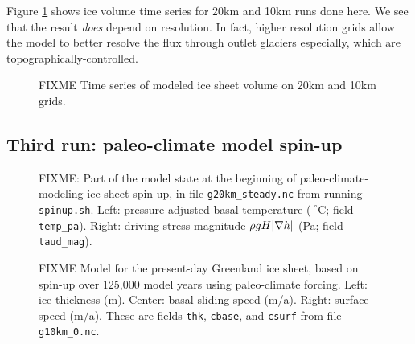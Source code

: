 Figure \ref{fig:ivolboth} shows ice volume time series for 20km and 10km runs done here.  We see that the result \emph{does} depend on resolution.  In fact, higher resolution grids allow the model to better resolve the flux through outlet glaciers especially, which are topographically-controlled.

\begin{figure}[ht]
\centering
\caption{FIXME Time series of modeled ice sheet volume on 20km and 10km grids.}
\label{fig:ivolboth}
\end{figure}


\subsection{Third run: paleo-climate model spin-up}  \label{subsect:paleorun}  


\begin{figure}[ht]
\centering
\caption{FIXME: Part of the model state at the beginning of paleo-climate-modeling ice sheet spin-up, in file \texttt{g20km_steady.nc} from running \texttt{spinup.sh}.  Left: pressure-adjusted basal temperature ($\phantom{|}^\circ$C; field \texttt{temp_pa}).  Right: driving stress magnitude $\rho g H |\nabla h|$ (Pa; field \texttt{taud_mag}).}
\label{fig:sr-spinstart}
\end{figure}


\begin{figure}[ht]
\centering
\caption{FIXME Model for the present-day Greenland ice sheet, based on spin-up over 125,000 model years using paleo-climate forcing.  Left: ice thickness (m).  Center: basal sliding speed (m/a).  Right: surface speed (m/a).  These are fields \texttt{thk}, \texttt{cbase}, and \texttt{csurf} from file \texttt{g10km_0.nc}.}
\label{fig:sr-spindone-map}
\end{figure}

